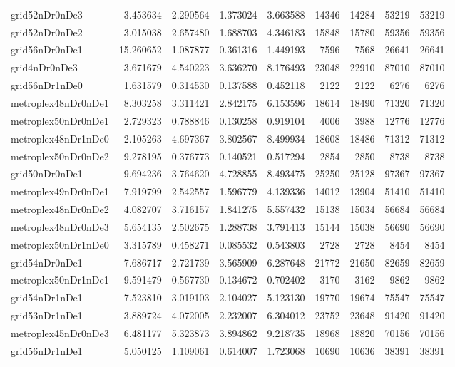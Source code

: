 \begin{longtable}{|l|r|r|r|r|r|r|r|r|}
grid52nDr0nDe3 & 3.453634 & 2.290564 & 1.373024 & 3.663588 & 14346 & 14284 & 53219 & 53219 \\
grid52nDr0nDe2 & 3.015038 & 2.657480 & 1.688703 & 4.346183 & 15848 & 15780 & 59356 & 59356 \\
grid56nDr0nDe1 & 15.260652 & 1.087877 & 0.361316 & 1.449193 & 7596 & 7568 & 26641 & 26641 \\
grid4nDr0nDe3 & 3.671679 & 4.540223 & 3.636270 & 8.176493 & 23048 & 22910 & 87010 & 87010 \\
grid56nDr1nDe0 & 1.631579 & 0.314530 & 0.137588 & 0.452118 & 2122 & 2122 & 6276 & 6276 \\
metroplex48nDr0nDe1 & 8.303258 & 3.311421 & 2.842175 & 6.153596 & 18614 & 18490 & 71320 & 71320 \\
metroplex50nDr0nDe1 & 2.729323 & 0.788846 & 0.130258 & 0.919104 & 4006 & 3988 & 12776 & 12776 \\
metroplex48nDr1nDe0 & 2.105263 & 4.697367 & 3.802567 & 8.499934 & 18608 & 18486 & 71312 & 71312 \\
metroplex50nDr0nDe2 & 9.278195 & 0.376773 & 0.140521 & 0.517294 & 2854 & 2850 & 8738 & 8738 \\
grid50nDr0nDe1 & 9.694236 & 3.764620 & 4.728855 & 8.493475 & 25250 & 25128 & 97367 & 97367 \\
metroplex49nDr0nDe1 & 7.919799 & 2.542557 & 1.596779 & 4.139336 & 14012 & 13904 & 51410 & 51410 \\
metroplex48nDr0nDe2 & 4.082707 & 3.716157 & 1.841275 & 5.557432 & 15138 & 15034 & 56684 & 56684 \\
metroplex48nDr0nDe3 & 5.654135 & 2.502675 & 1.288738 & 3.791413 & 15144 & 15038 & 56690 & 56690 \\
metroplex50nDr1nDe0 & 3.315789 & 0.458271 & 0.085532 & 0.543803 & 2728 & 2728 & 8454 & 8454 \\
grid54nDr0nDe1 & 7.686717 & 2.721739 & 3.565909 & 6.287648 & 21772 & 21650 & 82659 & 82659 \\
metroplex50nDr1nDe1 & 9.591479 & 0.567730 & 0.134672 & 0.702402 & 3170 & 3162 & 9862 & 9862 \\
grid54nDr1nDe1 & 7.523810 & 3.019103 & 2.104027 & 5.123130 & 19770 & 19674 & 75547 & 75547 \\
grid53nDr1nDe1 & 3.889724 & 4.072005 & 2.232007 & 6.304012 & 23752 & 23648 & 91420 & 91420 \\
metroplex45nDr0nDe3 & 6.481177 & 5.323873 & 3.894862 & 9.218735 & 18968 & 18820 & 70156 & 70156 \\
grid56nDr1nDe1 & 5.050125 & 1.109061 & 0.614007 & 1.723068 & 10690 & 10636 & 38391 & 38391 \\

\end{longtable}
